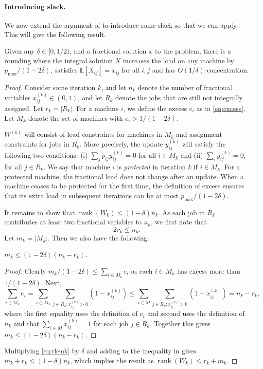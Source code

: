 \documentclass{toc}
\newcommand{\rank}{\operatorname{rank}}
\newcommand{\E}{\mathbb{E}}
\begin{document}
\paragraph{Introducing slack.} We now extend the argument of \cite{Lau-book} to introduce some slack so that we can apply . This will give the  following result.
\begin{theorem}
\label{thm:lst}
Given any $\delta \in [0,1/2)$, and a fractional solution $x$ to the problem, there is a rounding where the integral solution $X$ increases the load on any machine by $p_{\max}/(1-2\delta)$,  satisfies  $\E[X_{ij}]=x_{ij}$ for all $i,j$ and has $O(1/\delta)$-concentration.
\end{theorem}
\begin{proof}
%
Consider some iteration $k$,
and let $n_k$ denote the number of fractional variables $x^{(k)}_{ij} \in (0,1)$, and let $R_k$ denote the jobs that are still not integrally assigned. Let $r_k=|R_k|$.
For a machine $i$, we define the excess $e_i$ as in \eqref{eq:excess}. Let $M_k$ denote the set of machines with $e_i > 1/(1-2 \delta)$.

$W^{(k)}$ will consist of load constraints for machines in $M_k$ and assignment constraints for jobs in $R_k$. More precisely, the update $y^{(k)}_{ij}$ will satisfy the following two conditions:
(i) $ \sum_j p_{ij} y^{(k)}_{ij} = 0$   for all $i \in M_k$ and (ii)
$ \sum_i y^{(k)}_{ij}  = 0$, for all $j \in R_k$.
We say that machine $i$ is \emph{protected} in iteration $k$ if $i \in M_k$. For a protected machine, the fractional load does not change after an update.
%
%
%
When a machine ceases to be protected for the first time, the definition of excess ensures that its extra load in subsequent iterations can be at most $p_{\max}/(1-2\delta)$.

It remains to show that $\rank(W_k) \leq (1-\delta) n_k$.
As each job in $R_k$ contributes at least two fractional variables to $n_k$, we first note that
\begin{equation}
    \label{eq:rk-nk}2r_k \leq n_k.
\end{equation}
Let $m_k = |M_k|$. Then we also have the following.
\begin{claim}
\label{cl:mknkrk}
$m_k \leq (1-2\delta) (n_k-r_k)$.
\end{claim}
\begin{proof}
Clearly $m_k/(1-2\delta) \leq \sum_{i \in M_k}  e_i$  as each  $i\in M_k$ has excess more than $1/(1-2\delta)$.
Next,
\[   \sum_{i \in M_k} e_i =   \sum_{i \in M_k} \sum_{j \in R_k: x^{(k)}_{ij}>0}  (1-x^{(k)}_{ij}) \leq   \sum_{i \in M} \sum_{j \in R_k: x^{(k)}_{ij}>0}  (1-x^{(k)}_{ij})  = n_k -r_k,\]
where the first equality uses the definition of $e_i$ and second uses the definition of $n_k$ and that $\sum_{i  \in M} x^{(k)}_{ij} =1$ for each job $j \in R_k$.  
Together this gives $m_k \leq (1-2\delta)(n_k-r_k)$.
\end{proof}
Multiplying \eqref{eq:rk-nk} by $\delta$ and adding to the inequality in  gives $  m_k + r_k \leq (1-\delta) n_k$, which implies the result as $\rank(W_k) \leq r_k +m_k$.
\end{proof}
\end{document}
